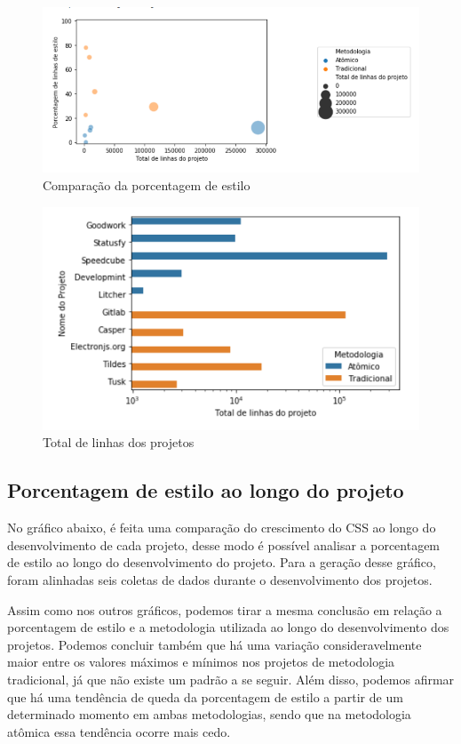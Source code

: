 \begin{figure}[H]
\centering
\includegraphics{figuras/porcentagem-linhas-estilo.png}
\caption{Comparação da porcentagem de estilo}
\end{figure}

\begin{figure}[H]
\centering
\includegraphics{figuras/tamanho-projeto.png}
\caption{Total de linhas dos projetos}
\end{figure}


\hypertarget{porcentagem de estilo}{%
\subsection{Porcentagem de estilo ao longo do projeto}\label{parcel}}

No gráfico abaixo, é feita uma comparação do crescimento do CSS ao longo do desenvolvimento de cada projeto, desse modo é possível analisar a porcentagem de estilo ao longo do desenvolvimento do projeto. Para a geração desse gráfico, foram alinhadas seis coletas de dados durante o desenvolvimento dos projetos.

Assim como nos outros gráficos, podemos tirar a mesma conclusão em relação a porcentagem de estilo e a metodologia utilizada ao longo do desenvolvimento dos projetos. Podemos concluir também que há uma variação consideravelmente maior entre os valores máximos e mínimos nos projetos de metodologia tradicional, já que não existe um padrão a se seguir. Além disso, podemos afirmar que há uma tendência de queda da porcentagem de estilo a partir de um determinado momento em ambas metodologias, sendo que na metodologia atômica essa tendência ocorre mais cedo.


